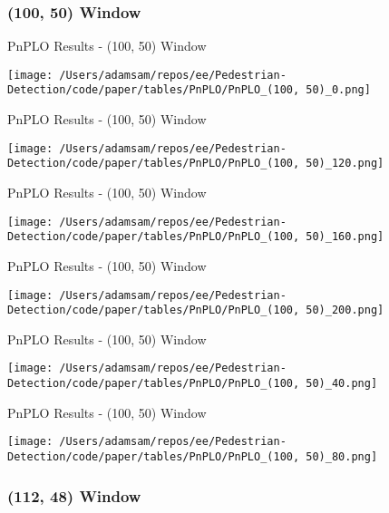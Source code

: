
\subsubsection*{(100, 50) Window}

\begin{table}
    \caption{PnPLO Results - (100, 50) Window}
    \texttt{[image: /Users/adamsam/repos/ee/Pedestrian-Detection/code/paper/tables/PnPLO/PnPLO\_(100, 50)\_0.png]}
    \label{tab:PnPLO_(100, 50)_0}
\end{table}

\begin{table}
    \caption{PnPLO Results - (100, 50) Window}
    \texttt{[image: /Users/adamsam/repos/ee/Pedestrian-Detection/code/paper/tables/PnPLO/PnPLO\_(100, 50)\_120.png]}
    \label{tab:PnPLO_(100, 50)_120}
\end{table}

\begin{table}
    \caption{PnPLO Results - (100, 50) Window}
    \texttt{[image: /Users/adamsam/repos/ee/Pedestrian-Detection/code/paper/tables/PnPLO/PnPLO\_(100, 50)\_160.png]}
    \label{tab:PnPLO_(100, 50)_160}
\end{table}

\begin{table}
    \caption{PnPLO Results - (100, 50) Window}
    \texttt{[image: /Users/adamsam/repos/ee/Pedestrian-Detection/code/paper/tables/PnPLO/PnPLO\_(100, 50)\_200.png]}
    \label{tab:PnPLO_(100, 50)_200}
\end{table}

\begin{table}
    \caption{PnPLO Results - (100, 50) Window}
    \texttt{[image: /Users/adamsam/repos/ee/Pedestrian-Detection/code/paper/tables/PnPLO/PnPLO\_(100, 50)\_40.png]}
    \label{tab:PnPLO_(100, 50)_40}
\end{table}

\begin{table}
    \caption{PnPLO Results - (100, 50) Window}
    \texttt{[image: /Users/adamsam/repos/ee/Pedestrian-Detection/code/paper/tables/PnPLO/PnPLO\_(100, 50)\_80.png]}
    \label{tab:PnPLO_(100, 50)_80}
\end{table}

\subsubsection*{(112, 48) Window}


